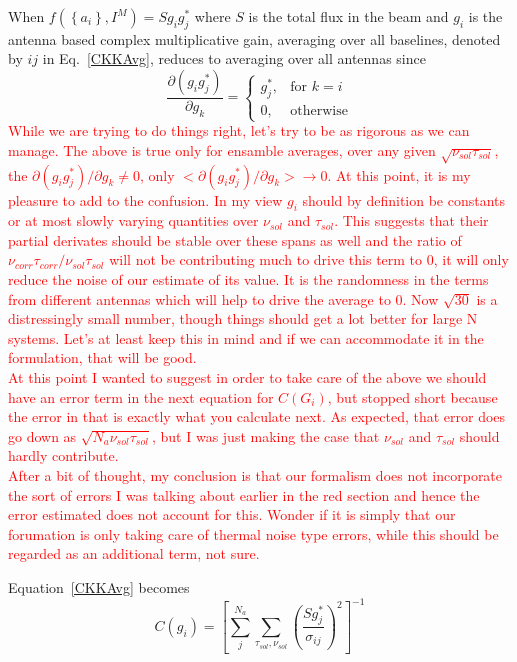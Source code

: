 \documentclass[11pt]{article}
\begin{document}
When $f(\left\{a_i\right\}, I^M)=S g_i g_j^*$ where $S$ is the total
flux in the beam and $g_i$ is the antenna based complex multiplicative
gain, averaging over all baselines, denoted by $ij$ in Eq.~\ref{CKKAvg},
reduces to averaging over all antennas since
\begin{equation}
  \frac{\partial (g_ig_j^*)}{\partial g_k} = 
  \begin{cases}
    g_j^*, &\text{for $k=i$}\\
    0,    &\text{otherwise}
  \end{cases}
\end{equation}
\textcolor{red}{
While we are trying to do things right, let's try to be as rigorous as we can manage. 
The above is true only for ensamble averages, over any given $\sqrt{\nu_{sol} \tau_{sol}}$, the ${\partial (g_ig_j^*)}/{\partial g_k} \neq  0$, only $<{\partial (g_ig_j^*)}/{\partial g_k}> \rightarrow  0$. 
At this point, it is my pleasure to add to the confusion. In my view $g_i$ should by definition be constants or at most slowly varying quantities over $\nu_{sol}$ and $\tau_{sol}$. 
This suggests that their partial derivates should be stable over these spans as well and the ratio of $\nu_{corr} \tau_{corr}/{\nu_{sol} \tau_{sol}}$ will not be contributing much to drive this term to 0, it will only reduce the noise of our estimate of its value.
It is the randomness in the terms from different antennas which will help to drive the average to 0. 
Now $\sqrt{30}$ is a distressingly small number, though things should get a lot better for large N systems.
Let's at least keep this in mind and if we can accommodate it in the formulation, that will be good.\\
At this point I wanted to suggest in order to take care of the above we should have an error term in the next equation for $C(G_i)$, but stopped short because the error in that is exactly what you calculate next. 
As expected, that error does go down as $\sqrt{N_a \nu_{sol} \tau_{sol}}$, but I was just making the case that $\nu_{sol}$ and $\tau_{sol}$ should hardly contribute.\\
After a bit of thought, my conclusion is that our formalism does not incorporate the sort of errors I was talking about earlier in the red section and hence the error estimated does not account for this.
Wonder if it is simply that our forumation is only taking care of thermal noise type errors, while this should be regarded as an additional term, not sure.
}

Equation~\ref{CKKAvg} becomes
\begin{equation}
C(g_i) = \left[ \sum^{N_a}_{j} \sum_{\tau_{sol},\nu_{sol}}\left(\frac{Sg^*_j}{\sigma_{ij}}\right)^2  \right]^{-1}
\end{equation}
\end{document}
